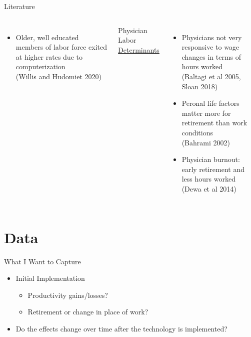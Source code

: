 \documentclass[10pt]{beamer}
\begin{document}
\begin{frame}[noframenumbering]{Literature}
\begin{columns}
\begin{itemize}
            \footnotesize
            
            \item Older, well educated members of labor force exited at higher rates due to computerization \\ \vspace{1mm}
            \tiny (Willis and Hudomiet 2020)
        \end{itemize}
        
        
        \centering
        Physician Labor \underline{ Determinants }
        \begin{itemize}
            \item Physicians not very responsive to wage changes in terms of hours worked \\ \vspace{1mm}
            \tiny (Baltagi et al 2005, Sloan 2018)
            
            \footnotesize
            
            \item Peronal life factors matter more for retirement than work conditions \\ \vspace{1mm}
            \tiny (Bahrami 2002)
            
            \footnotesize
            
            \item Physician burnout: early retirement and less hours worked \\ \vspace{1mm} 
            \tiny (Dewa et al 2014)
        \end{itemize}
\end{columns}
\end{frame}





\section{Data}


\begin{frame}{What I Want to Capture}
\begin{itemize}
    \item Initial Implementation
    \vspace{3mm}
    \begin{itemize}
        \item Productivity gains/losses?
        \vspace{3mm}
        \item Retirement or change in place of work?
        \vspace{3mm}
    \end{itemize}
    \item Do the effects change over time after the technology is implemented?

\end{itemize}


\end{frame}
\end{document}

